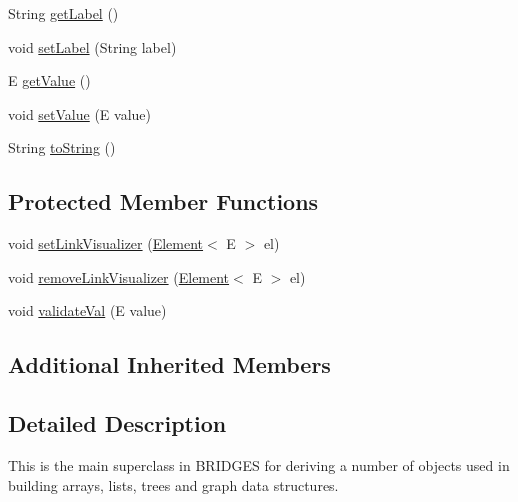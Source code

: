 \begin{DoxyCompactItemize}
\item 
String \mbox{\hyperlink{classbridges_1_1base_1_1_element_a5c831a0238de487765f6021a887f1542}{get\+Label}} ()
\item 
void \mbox{\hyperlink{classbridges_1_1base_1_1_element_a942ccd766aeca0c4fdbe27ef8cbe78d9}{set\+Label}} (String label)
\item 
E \mbox{\hyperlink{classbridges_1_1base_1_1_element_a44ddc61db34b6cf0bab7dfba667d54af}{get\+Value}} ()
\item 
void \mbox{\hyperlink{classbridges_1_1base_1_1_element_ab3cf1241da0bc4c59cea9d6f0fd7aaf4}{set\+Value}} (E value)
\item 
String \mbox{\hyperlink{classbridges_1_1base_1_1_element_a7dc685e317fd9dc2e73e049a9f907e42}{to\+String}} ()
\end{DoxyCompactItemize}
\subsection*{Protected Member Functions}
\begin{DoxyCompactItemize}
\item 
void \mbox{\hyperlink{classbridges_1_1base_1_1_element_af6251f52b9d277dd77e3bab1829d0197}{set\+Link\+Visualizer}} (\mbox{\hyperlink{classbridges_1_1base_1_1_element}{Element}}$<$ E $>$ el)
\item 
void \mbox{\hyperlink{classbridges_1_1base_1_1_element_a144cd54e043a801fab326769a5da01e2}{remove\+Link\+Visualizer}} (\mbox{\hyperlink{classbridges_1_1base_1_1_element}{Element}}$<$ E $>$ el)
\item 
void \mbox{\hyperlink{classbridges_1_1base_1_1_element_af1a60f4e6a91d379179f7d56e6dc3829}{validate\+Val}} (E value)
\end{DoxyCompactItemize}
\subsection*{Additional Inherited Members}


\subsection{Detailed Description}
This is the main superclass in B\+R\+I\+D\+G\+ES for deriving a number of objects used in building arrays, lists, trees and graph data structures. 


